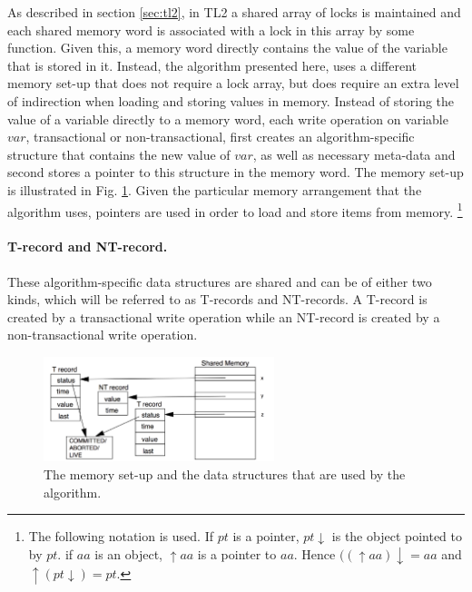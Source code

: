 As described in section \ref{sec:tl2}, in TL2 a  shared array of locks is maintained and each
shared memory word  
is associated with a lock in this array by some function. Given this, a memory
word directly contains  
the value of the variable that  is stored in it.
Instead, the algorithm presented here, uses
a  different memory set-up that does not require a lock array, but does require
an extra level of indirection when loading and storing values in memory.
Instead of storing the value of a variable directly to a memory word,
each  write  operation  on  variable  $\mathit{var}$,   transactional  or
non-transactional, first creates an algorithm-specific   
structure that contains the new value of  $\mathit{var}$, as
well as necessary meta-data and second stores a pointer to this structure in the memory word.
The memory set-up  is illustrated in Fig.  \ref{fig:mem_setup}.
Given the particular memory arrangement  that the algorithm uses,
pointers are used in order to load and store items from memory.
\footnote{The following  notation  is
used. If $pt$ is a pointer, $pt\downarrow$ is the object pointed to by $pt$. 
if $aa$ is an object, $\uparrow aa$ is a pointer to $aa$. Hence 
$((\uparrow aa)\downarrow =aa$ and $ \uparrow(pt \downarrow)=pt$.}


\paragraph{T-record  and NT-record.}
These  algorithm-specific  data structures  are shared  and  can be  of 
either  two  kinds, which will be referred   to as T-records and NT-records. 
A T-record is created by a transactional write operation while an 
NT-record is created by a  non-transactional write operation.


\begin{figure}[ht]
\centerline{
    \mbox{\includegraphics[width=0.6\textwidth]{SI/imgs/mem_setup_single}}
}
\caption{The memory set-up and the data structures that are used by the 
algorithm.}
\label{fig:mem_setup}
\end{figure}

